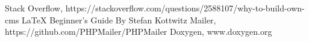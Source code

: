 
\begin{thebibliography}{9}
\bibitem{} Stack Overflow, https://stackoverflow.com/questions/2588107/why-to-build-own-cms
\bibitem{} \LaTeX{} Beginner's Guide By Stefan Kottwitz 
\bibitem{} Mailer, https://github.com/PHPMailer/PHPMailer
\bibitem{} Doxygen, www.doxygen.org
\end{thebibliography}


